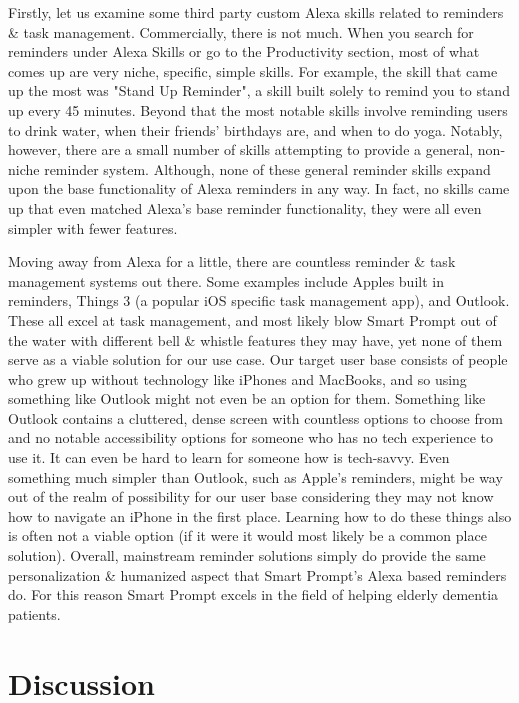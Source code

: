 \documentclass[11pt, oneside]{article}
\begin{document}
Firstly, let us examine some third party custom Alexa skills related to reminders \& task management. 
Commercially, there is not much. 
When you search for reminders under Alexa Skills or go to the Productivity section, most of what comes up are very niche, specific, simple skills. 
For example, the skill that came up the most was "Stand Up Reminder", a skill built solely to remind you to stand up every 45 minutes. 
Beyond that the most notable skills involve reminding users to drink water, when their friends' birthdays are, and when to do yoga. 
Notably, however, there are a small number of skills attempting to provide a general, non-niche reminder system. 
Although, none of these general reminder skills expand upon the base functionality of Alexa reminders in any way. 
In fact, no skills came up that even matched Alexa's base reminder functionality, they were all even simpler with fewer features. 

Moving away from Alexa for a little, there are countless reminder \& task management systems out there. 
Some examples include Apples built in reminders, Things 3 (a popular iOS specific task management app), and Outlook. 
These all excel at task management, and most likely blow Smart Prompt out of the water with different bell \& whistle features they may have, yet none of them serve as a viable solution for our use case. 
Our target user base consists of people who grew up without technology like iPhones and MacBooks, and so using something like Outlook might not even be an option for them. 
Something like Outlook contains a cluttered, dense screen with countless options to choose from and no notable accessibility options for someone who has no tech experience to use it. 
It can even be hard to learn for someone how is tech-savvy. 
Even something much simpler than Outlook, such as Apple's reminders, might be way out of the realm of possibility for our user base considering they may not know how to navigate an iPhone in the first place. 
Learning how to do these things also is often not a viable option (if it were it would most likely be a common place solution).
Overall, mainstream reminder solutions simply do provide the same personalization \& humanized aspect that Smart Prompt's Alexa based reminders do. 
For this reason Smart Prompt excels in the field of helping elderly dementia patients. 


\section{Discussion}
\end{document}
